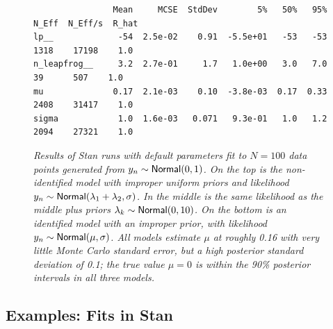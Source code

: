 \begin{figure}
\begin{Verbatim}
                Mean     MCSE  StdDev        5%   50%   95%  N_Eff  N_Eff/s  R_hat
lp__             -54  2.5e-02    0.91  -5.5e+01   -53   -53   1318    17198    1.0
n_leapfrog__     3.2  2.7e-01     1.7   1.0e+00   3.0   7.0     39      507    1.0
mu              0.17  2.1e-03    0.10  -3.8e-03  0.17  0.33   2408    31417    1.0
sigma            1.0  1.6e-03   0.071   9.3e-01   1.0   1.2   2094    27321    1.0
\end{Verbatim}
%
\caption{\small\it Results of Stan runs with default parameters fit to
  $N=100$ data points generated from $y_n \sim \mbox{\sf Normal}(0,1)$.
  On the top is the non-identified model with improper uniform priors
  and likelihood $y_n \sim \mbox{\sf Normal}(\lambda_1 + \lambda_2,
  \sigma)$.
  In the middle is the same likelihood as the middle plus priors
  $\lambda_k \sim \mbox{\sf Normal}(0,10)$.
  On the bottom is an identified model with an improper prior, with
  likelihood  $y_n \sim \mbox{\sf Normal}(\mu,\sigma)$.  All models
  estimate $\mu$ at roughly 0.16 with very little Monte Carlo standard
  error, but a high posterior standard deviation of 0.1;  the true
  value $\mu=0$ is within the 90\% posterior intervals in all three models.
}%
\label{non-identified-stan-fits.figure}
\end{figure}
%

\subsection{Examples: Fits in Stan}

